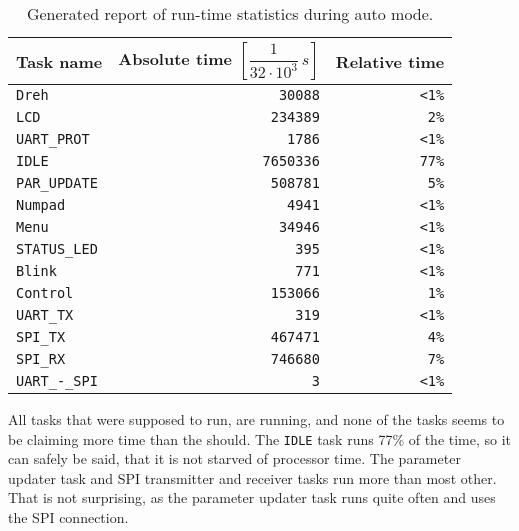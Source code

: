 \begin{table}[htb]
	\centering
	\begin{tabular}{lrr}
	Task name & Absolute time $\left[ \dfrac{1}{32 \cdot 10^3} \, s \right]$ & Relative time \\
	\midrule
  \texttt{Dreh}	&	\texttt{30088}	&	\texttt{<1\%}\\
  \texttt{LCD}	&	\texttt{234389}	&	\texttt{2\%}\\
  \texttt{UART\_PROT}	&	\texttt{1786}	&	\texttt{<1\%}\\
  \texttt{IDLE}	&	\texttt{7650336}	&	\texttt{77\%}\\
  \texttt{PAR\_UPDATE}&		\texttt{508781}	&	\texttt{5\%}\\
  \texttt{Numpad}	&	\texttt{4941}	&	\texttt{<1\%}\\
  \texttt{Menu}	&	\texttt{34946}	&	\texttt{<1\%}\\
  \texttt{STATUS\_LED}	&	\texttt{395}	&	\texttt{<1\%}\\
  \texttt{Blink}	&	\texttt{771}	&	\texttt{<1\%}\\
  \texttt{Control}	&	\texttt{153066}	&	\texttt{1\%}\\
  \texttt{UART\_TX}	&	\texttt{319}	&	\texttt{<1\%}\\
  \texttt{SPI\_TX}	&	\texttt{467471}	&	\texttt{4\%}\\
  \texttt{SPI\_RX}	&	\texttt{746680}	&	\texttt{7\%}\\
  \texttt{UART\_-\_SPI}	&	\texttt{3}	&	\texttt{<1\%}
	\end{tabular}
	\caption{Generated report of run-time statistics during auto mode.}
	\label{tab:runtimestats}
\end{table}

All tasks that were supposed to run, are running, and none of the tasks seems to be claiming more time than the should. The \texttt{IDLE} task runs 77\% of the time, so it can safely be said, that it is not starved of processor time. The parameter updater task and SPI transmitter and receiver tasks run more than most other. That is not surprising, as the parameter updater task runs quite often and uses the SPI connection.